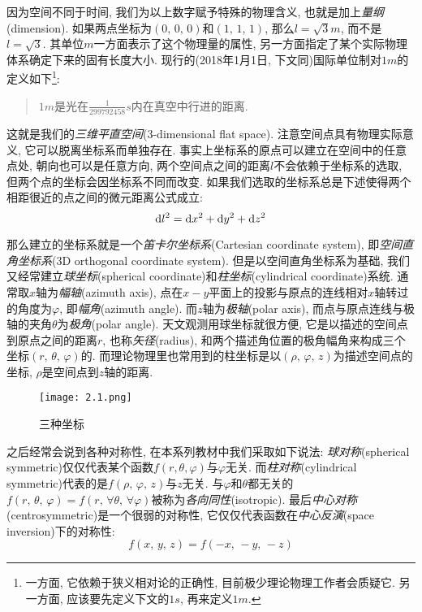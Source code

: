 因为空间不同于时间, 我们为以上数字赋予特殊的物理含义, 也就是加上\emph{量纲}(dimension). 如果两点坐标为$(0,\,0,\,0)$和$(1,\,1,\,1)$, 那么$l= \si{\sqrt{3}m}$, 而不是$l=\sqrt{3}$. 其单位$\si{m}$一方面表示了这个物理量的属性, 另一方面指定了某个实际物理体系确定下来的固有长度大小. 现行的(2018年1月1日, 下文同)国际单位制对$\si{1m}$的定义如下\footnote{一方面, 它依赖于狭义相对论的正确性, 目前极少理论物理工作者会质疑它. 另一方面, 应该要先定义下文的$\si{1s}$, 再来定义$\si{1m}$.}:
\begin{verse}\sf\large
$\si{1m}$是光在$\si{\frac{1}{299792458}s}$内在真空中行进的距离.
\end{verse}


这就是我们的\emph{三维平直空间}(3-dimensional flat space). 注意空间点具有物理实际意义, 它可以脱离坐标系而单独存在. 事实上坐标系的原点可以建立在空间中的任意点处, 朝向也可以是任意方向, 两个空间点之间的距离$l$不会依赖于坐标系的选取, 但两个点的坐标会因坐标系不同而改变. 如果我们选取的坐标系总是下述使得两个相距很近的点之间的微元距离公式成立:
\[\textrm{d} l^2=\textrm{d} x^2+\textrm{d} y^2+\textrm{d} z^2\]


那么建立的坐标系就是一个\emph{笛卡尔坐标系}(Cartesian coordinate system), 即\emph{空间直角坐标系}(3D orthogonal coordinate system). 但是以空间直角坐标系为基础, 我们又经常建立\emph{球坐标}(spherical coordinate)和\emph{柱坐标}(cylindrical coordinate)系统. 通常取$x$轴为\emph{幅轴}(azimuth axis), 点在$x-y$平面上的投影与原点的连线相对$x$轴转过的角度为$\varphi$, 即\emph{幅角}(azimuth angle). 而$z$轴为\emph{极轴}(polar axis), 而点与原点连线与极轴的夹角$\theta$为\emph{极角}(polar angle). 天文观测用球坐标就很方便, 它是以描述的空间点到原点之间的距离$r$, 也称\emph{矢径}(radius), 和两个描述角位置的极角幅角来构成三个坐标$(r,\,\theta,\,\varphi)$的. 而理论物理里也常用到的柱坐标是以$(\rho,\,\varphi,\,z)$为描述空间点的坐标, $\rho$是空间点到$z$轴的距离.

\begin{wrapfigure}[14]{o}[-10pt]{7cm}
\vspace{-0.4cm}
\centering
\texttt{[image: 2.1.png]}
\caption{三种坐标}
\end{wrapfigure}
之后经常会说到各种对称性, 在本系列教材中我们采取如下说法: \emph{球对称}(spherical symmetric)仅仅代表某个函数$f(r,\theta,\varphi)$与$\varphi$无关. 而\emph{柱对称}(cylindrical symmetric)代表的是$f(\rho,\,\varphi,\,z)$与$z$无关. 与$\varphi$和$\theta$都无关的$f(r,\,\theta,\,\varphi)=f(r,\,\forall\theta,\,\forall\varphi)$被称为\emph{各向同性}(isotropic). 最后\emph{中心对称}(centrosymmetric)是一个很弱的对称性, 它仅仅代表函数在\emph{中心反演}(space inversion)下的对称性:
\[f(x,\,y,\,z)=f(-x,\,-y,\,-z)\]

